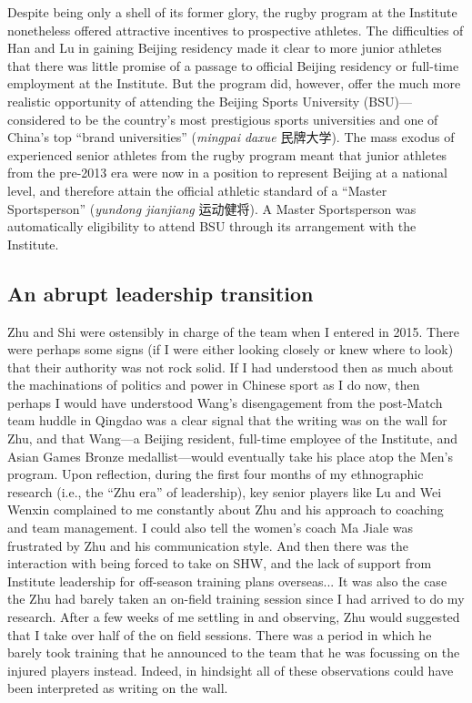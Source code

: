 \begin{CJK}{UTF8}{gbsn}
Despite being only a shell of its former glory, the rugby program at the Institute nonetheless offered attractive incentives to prospective athletes.  The difficulties of Han and Lu in gaining Beijing residency made it clear to more junior athletes that there was little promise of a passage to official Beijing residency or full-time employment at the Institute. But the program did, however, offer the much more realistic opportunity of attending the Beijing Sports University (BSU)---considered to be the country's most prestigious sports universities and one of China's top ``brand universities'' (\textit{mingpai daxue} 民牌大学).  The mass exodus of experienced senior athletes from the rugby program meant that junior athletes from the pre-2013 era were now in a position to represent Beijing at a national level, and therefore attain the official athletic standard of a ``Master Sportsperson'' (\textit{yundong jianjiang} 运动健将).  A Master Sportsperson was automatically eligibility to attend BSU through its arrangement with the Institute.


\subsection{An abrupt leadership transition\label{sect:leadershipTrans}}
Zhu and Shi were ostensibly in charge of the team when I entered in 2015. There were perhaps some signs (if I were either looking closely or knew where to look) that their authority was not rock solid.  If I had understood then as much about the machinations of politics and power in Chinese sport as I do now, then perhaps I would have understood Wang's disengagement from the post-Match team huddle in Qingdao was a clear signal that the writing was on the wall for Zhu, and that Wang---a Beijing resident, full-time employee of the Institute, and Asian Games Bronze medallist---would eventually take his place atop the Men's program. Upon reflection, during the first four months of my ethnographic research (i.e., the ``Zhu era'' of leadership), key senior players like Lu and Wei Wenxin complained to me constantly about Zhu and his approach to coaching and team management.  I could also tell the women's coach Ma Jiale was frustrated by Zhu and his communication style.  And then there was the interaction with being forced to take on SHW, and the lack of support from Institute leadership for off-season training plans overseas... It was also the case the Zhu had barely taken an on-field training session since I had arrived to do my research.  After a few weeks of me settling in and observing, Zhu would suggested that I take over half of the on field sessions.  There was a period in which he barely took training that he announced to the team that he was focussing on the injured players instead. Indeed, in hindsight all of these observations could have been interpreted as writing on the wall.


\end{CJK}

